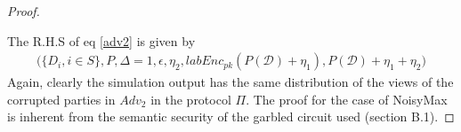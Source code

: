 \begin{proof}
\begin{enumerate}
\end{enumerate}
The R.H.S of eq \ref{adv2} is given by \begin{gather}\Big(\{D_i, i \in S\},P,\Delta=1,\epsilon,\eta_2,labEnc_{pk}(P(\mathcal{D})+\eta_1),P(\mathcal{D})+\eta_1+\eta_2\Big)\end{gather}
Again, clearly the simulation output has the same distribution of the
views of the corrupted parties in $Adv_2$ in the protocol $\Pi$. 
The proof for the case of NoisyMax is inherent from the semantic security of the garbled circuit used (section B.1).
\end{proof}